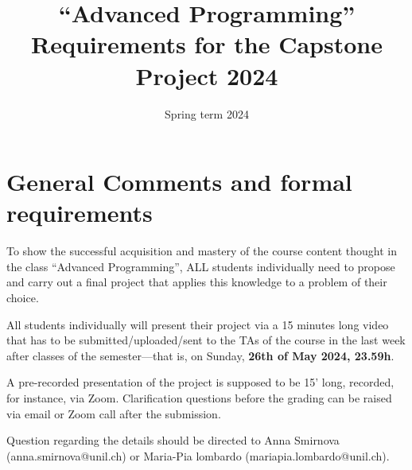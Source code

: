 \documentclass[12pt]{article} %
\title{``Advanced Programming''\\ Requirements for the Capstone Project 2024}
\date{Spring term 2024}
\begin{document}

\maketitle


\section{General Comments and formal requirements}

To show the successful acquisition and mastery of the course content thought in the class
``Advanced Programming'', ALL students individually need to propose and carry out a final project
that applies this knowledge to a problem of their choice.

All students individually will present their project via a 15 minutes long video that has to be submitted/uploaded/sent to the TAs of the course in the last week after classes of the semester---that is, on Sunday, {\bf{26th of May 2024, 23.59h}}.


A pre-recorded presentation of the project is supposed to be 15' long, recorded, for instance, via Zoom.
Clarification questions before the grading can be raised via email or Zoom call after the submission. 

Question regarding the details should be directed to Anna Smirnova (anna.smirnova@unil.ch) or Maria-Pia lombardo (mariapia.lombardo@unil.ch).
\end{document}
